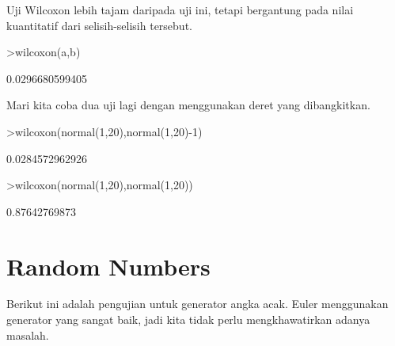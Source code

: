 \documentclass{article}
\newenvironment{eulernotebook}{\par}{\par}
\newcommand{\eulerheading}[1]{\section{#1}}
\newenvironment{eulercomment}{\par\medskip}{\par\medskip}
\begin{document}
\begin{eulernotebook}
\begin{eulercomment}
\begin{eulercomment}
\begin{eulercomment}
Uji Wilcoxon lebih tajam daripada uji ini, tetapi bergantung pada
nilai kuantitatif dari selisih-selisih tersebut.
\end{eulercomment}
\begin{eulerprompt}
>wilcoxon(a,b)
\end{eulerprompt}
\begin{euleroutput}
  0.0296680599405
\end{euleroutput}
\begin{eulercomment}
Mari kita coba dua uji lagi dengan menggunakan deret yang
dibangkitkan.
\end{eulercomment}
\begin{eulerprompt}
>wilcoxon(normal(1,20),normal(1,20)-1)
\end{eulerprompt}
\begin{euleroutput}
  0.0284572962926
\end{euleroutput}
\begin{eulerprompt}
>wilcoxon(normal(1,20),normal(1,20))
\end{eulerprompt}
\begin{euleroutput}
  0.87642769873
\end{euleroutput}
\eulerheading{Random Numbers}
\begin{eulercomment}
Berikut ini adalah pengujian untuk generator angka acak. Euler
menggunakan generator yang sangat baik, jadi kita tidak perlu
mengkhawatirkan adanya masalah.


\end{eulercomment}
\end{eulercomment}
\end{eulercomment}
\end{eulernotebook}
\end{document}
